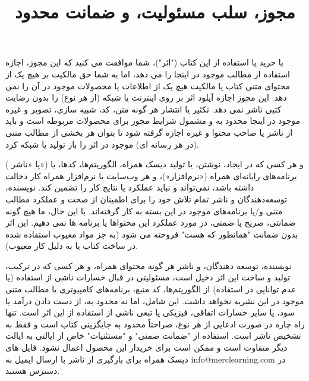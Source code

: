 \title{
    \center \Huge
    مجوز، سلب مسئولیت، و ضمانت محدود \\[25pt]
}
{ \large

    با خرید یا استفاده از این کتاب ("اثر")، شما موافقت می کنید که این مجوز، اجازه استفاده از مطالب موجود در اینجا را می دهد، اما به شما حق مالکیت بر هیچ یک از محتوای متنی کتاب یا مالکیت هیچ یک از اطلاعات یا محصولات موجود در آن را نمی دهد.
این مجوز اجازه آپلود اثر بر روی اینترنت یا شبکه (از هر نوع) را بدون رضایت کتبی ناشر نمی دهد.
تکثیر یا انتشار هر گونه متن، کد، شبیه سازی، تصویر و غیره موجود در اینجا محدود به و مشمول شرایط مجوز برای محصولات مربوطه است و باید از ناشر یا صاحب محتوا و غیره اجازه گرفته شود تا بتوان هر بخشی از مطالب متنی (در هر رسانه ای) موجود در اثر را باز تولید یا شبکه کرد.

     ( یا «ناشر») و هر کسی که در ایجاد، نوشتن، یا تولید دیسک همراه، الگوریتم‌ها، کدها، یا برنامه‌های رایانه‌ای همراه («نرم‌افزار»)، و هر وب‌سایت یا نرم‌افزار همراه کار دخالت داشته باشد، نمی‌تواند و نباید عملکرد یا نتایج کار را تضمین کند.
نویسنده، توسعه‌دهندگان و ناشر تمام تلاش خود را برای اطمینان از صحت و عملکرد مطالب متنی و/یا برنامه‌های موجود در این بسته به کار گرفته‌اند.
با این حال، ما هیچ گونه ضمانتی، صریح یا ضمنی، در مورد عملکرد این محتواها یا برنامه ها نمی دهیم.
این اثر بدون ضمانت "همانطور که هست" فروخته می شود (به جز مواد معیوب استفاده شده در ساخت کتاب یا به دلیل کار معیوب).

    نویسنده، توسعه دهندگان، و ناشر هر گونه محتوای همراه، و هر کسی که در ترکیب، تولید و ساخت این اثر دخیل است، مسئولیتی در قبال خسارات ناشی از استفاده (یا عدم توانایی در استفاده) از الگوریتم‌ها، کد منبع، برنامه‌های کامپیوتری یا مطالب متنی موجود در این نشریه نخواهد داشت.
این شامل، اما نه محدود به، از دست دادن درآمد یا سود، یا سایر خسارات اتفاقی، فیزیکی یا تبعی ناشی از استفاده از این اثر است.
تنها راه چاره در صورت ادعایی از هر نوع، صراحتاً محدود به جایگزینی کتاب است و فقط به تشخیص ناشر است.
استفاده از "ضمانت ضمنی" و "مستثنیات" خاص از ایالتی به ایالت دیگر متفاوت است و ممکن است برای خریدار این محصول اعمال نشود.
فایل های دیسک همراه برای بارگیری از ناشر با ارسال ایمیل به info@merclearning.com در دسترس هستند.

}
\newpage
\begin{titlepage}
    \vspace*{\fill}
    \begin{center}
    {\center \Huge \textbf{\CourseNameEng}}
    \end{center}
    \vspace*{\fill}
\end{titlepage}

